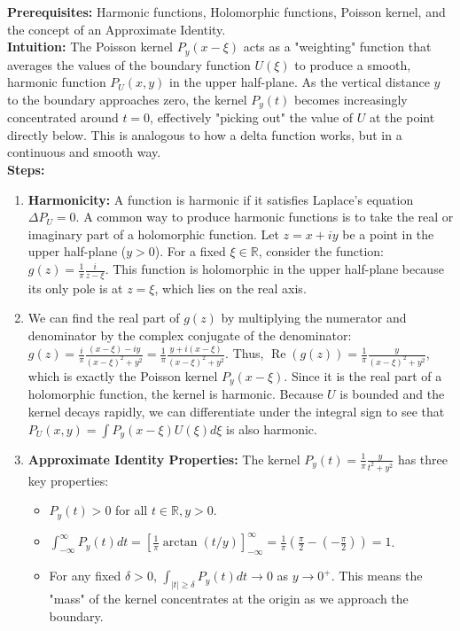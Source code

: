 \begin{solution}
\textbf{Prerequisites:} Harmonic functions, Holomorphic functions, Poisson kernel, and the concept of an Approximate Identity. \\[1em]
\textbf{Intuition:} The Poisson kernel $P_y(x-\xi)$ acts as a "weighting" function that averages the values of the boundary function $U(\xi)$ to produce a smooth, harmonic function $P_U(x,y)$ in the upper half-plane. As the vertical distance $y$ to the boundary approaches zero, the kernel $P_y(t)$ becomes increasingly concentrated around $t=0$, effectively "picking out" the value of $U$ at the point directly below. This is analogous to how a delta function works, but in a continuous and smooth way. \\[1em]
\textbf{Steps:}
\begin{enumerate}
    \item \textbf{Harmonicity:} A function is harmonic if it satisfies Laplace's equation $\Delta P_U = 0$. A common way to produce harmonic functions is to take the real or imaginary part of a holomorphic function. Let $z = x+iy$ be a point in the upper half-plane ($y>0$). For a fixed $\xi \in \mathbb{R}$, consider the function:
    $g(z) = \frac{1}{\pi} \frac{i}{z-\xi}$.
    This function is holomorphic in the upper half-plane because its only pole is at $z=\xi$, which lies on the real axis.

    \item We can find the real part of $g(z)$ by multiplying the numerator and denominator by the complex conjugate of the denominator:
    $g(z) = \frac{i}{\pi} \frac{(x-\xi)-iy}{(x-\xi)^2+y^2} = \frac{1}{\pi} \frac{y + i(x-\xi)}{(x-\xi)^2+y^2}$.
    Thus, $\operatorname{Re}(g(z)) = \frac{1}{\pi} \frac{y}{(x-\xi)^2+y^2}$, which is exactly the Poisson kernel $P_y(x-\xi)$. Since it is the real part of a holomorphic function, the kernel is harmonic. Because $U$ is bounded and the kernel decays rapidly, we can differentiate under the integral sign to see that $P_U(x,y) = \int P_y(x-\xi) U(\xi) d\xi$ is also harmonic.

    \item \textbf{Approximate Identity Properties:} The kernel $P_y(t) = \frac{1}{\pi} \frac{y}{t^2+y^2}$ has three key properties:
       \begin{itemize}
           \item[(a)] $P_y(t) > 0$ for all $t \in \mathbb{R}, y > 0$.
           \item[(b)] $\int_{-\infty}^{\infty} P_y(t) dt = \left[ \frac{1}{\pi} \arctan(t/y) \right]_{-\infty}^{\infty} = \frac{1}{\pi} (\frac{\pi}{2} - (-\frac{\pi}{2})) = 1$.
           \item[(c)] For any fixed $\delta > 0$, $\int_{|t| \geq \delta} P_y(t) dt \to 0$ as $y \to 0^+$. This means the "mass" of the kernel concentrates at the origin as we approach the boundary.
       \end{itemize}


\end{enumerate}
\end{solution}
